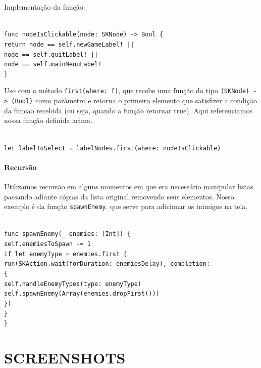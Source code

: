 \documentclass[rel_mlp]{iiufrgs}
\newcommand\tab[1][1cm]{\hspace*{#1}}
\begin{document}
Implementação da função:

\texttt{
\\func nodeIsClickable(node: SKNode) -> Bool \{
\\\tab return node == self.newGameLabel! ||
\\\tab\tab\tab node == self.quitLabel! ||
\\\tab\tab\tab node == self.mainMenuLabel!
\\\}}
    
Uso com o método \texttt{first(where: f)}, que recebe uma função do tipo \texttt{(SKNode) -> (Bool)} como parâmetro e retorna o primeiro elemento que satisfizer a condição da funcao recebida (ou seja, quando a função retornar true). Aqui referenciamos nossa função definida acima.

\texttt{\\let labelToSelect = labelNodes.first(where: nodeIsClickable)}


\subsubsection{Recursão}

Utilizamos recursão em alguns momentos em que era necessário manipular listas passando adiante cópias da lista original removendo seus elementos.
Nosso exemplo é da função \texttt{spawnEnemy}, que serve para adicionar os inimigos na tela.

\texttt{
\\func spawnEnemy(\_ enemies: [Int]) \{
\\\tab self.enemiesToSpawn -= 1
\\\tab if let enemyType = enemies.first \{
\\\tab\tab run(SKAction.wait(forDuration: enemiesDelay), completion:
\\\tab\tab \{
\\\tab\tab\tab self.handleEnemyTypes(type: enemyType)
\\\tab\tab\tab self.spawnEnemy(Array(enemies.dropFirst()))
\\\tab\tab \})
\\\tab \}
\\\}
}

%
\chapter{SCREENSHOTS}
\end{document}
